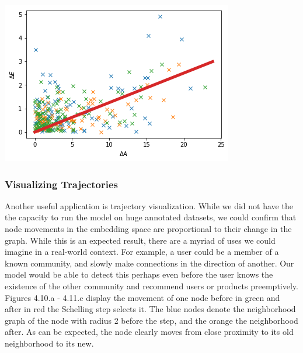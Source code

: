 \documentclass[12pt,twoside]{report}
\begin{document}
\begin{center}
\begin{minipage}{0.45\linewidth}
\end{minipage}
\hfill
\begin{minipage}{0.45\linewidth}
\includegraphics[width=\linewidth]{figures/emb_change.png}
\end{minipage}%
\end{center}

\subsubsection{Visualizing Trajectories}

Another useful application is trajectory visualization. While we did not have the the capacity to run the model on huge annotated datasets, we could confirm that node movements in the embedding space are proportional to their change in the graph. While this is an expected result, there are a myriad of uses we could imagine in a real-world context. For example, a user could be a member of a known community, and slowly make connections in the direction of another. Our model would be able to detect this perhaps even before the user knows the existence of the other community and recommend users or products preemptively. \\

Figures 4.10.a - 4.11.c display the movement of one node before in green and after in red the Schelling step selects it. The blue nodes denote the neighborhood graph of the node with radius 2 before the step, and the orange the neighborhood after. As can be expected, the node clearly moves from close proximity to its old neighborhood to its new. \\ 
\end{document}
